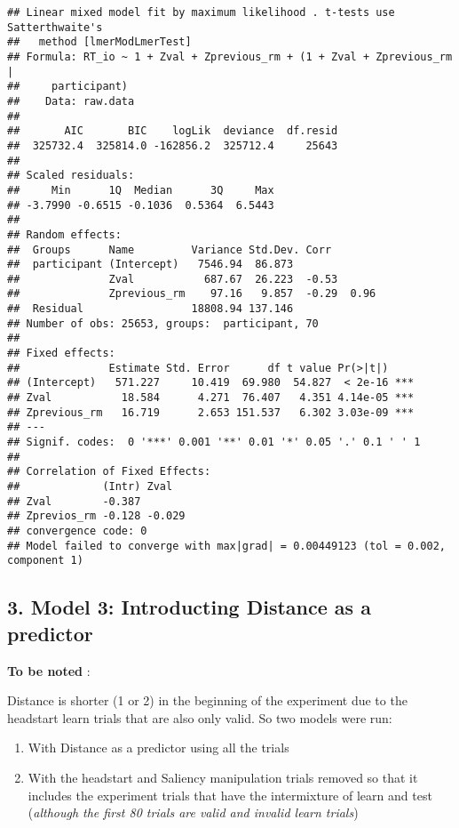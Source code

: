 \documentclass[
]{article}
\providecommand{\tightlist}{%
  \setlength{\itemsep}{0pt}\setlength{\parskip}{0pt}}
\begin{document}
\begin{verbatim}
## Linear mixed model fit by maximum likelihood . t-tests use Satterthwaite's
##   method [lmerModLmerTest]
## Formula: RT_io ~ 1 + Zval + Zprevious_rm + (1 + Zval + Zprevious_rm |  
##     participant)
##    Data: raw.data
## 
##       AIC       BIC    logLik  deviance  df.resid 
##  325732.4  325814.0 -162856.2  325712.4     25643 
## 
## Scaled residuals: 
##     Min      1Q  Median      3Q     Max 
## -3.7990 -0.6515 -0.1036  0.5364  6.5443 
## 
## Random effects:
##  Groups      Name         Variance Std.Dev. Corr       
##  participant (Intercept)   7546.94  86.873             
##              Zval           687.67  26.223  -0.53      
##              Zprevious_rm    97.16   9.857  -0.29  0.96
##  Residual                 18808.94 137.146             
## Number of obs: 25653, groups:  participant, 70
## 
## Fixed effects:
##              Estimate Std. Error      df t value Pr(>|t|)    
## (Intercept)   571.227     10.419  69.980  54.827  < 2e-16 ***
## Zval           18.584      4.271  76.407   4.351 4.14e-05 ***
## Zprevious_rm   16.719      2.653 151.537   6.302 3.03e-09 ***
## ---
## Signif. codes:  0 '***' 0.001 '**' 0.01 '*' 0.05 '.' 0.1 ' ' 1
## 
## Correlation of Fixed Effects:
##             (Intr) Zval  
## Zval        -0.387       
## Zprevios_rm -0.128 -0.029
## convergence code: 0
## Model failed to converge with max|grad| = 0.00449123 (tol = 0.002, component 1)
\end{verbatim}

\hypertarget{model-3-introducting-distance-as-a-predictor}{%
\subsection{3. Model 3: Introducting Distance as a
predictor}\label{model-3-introducting-distance-as-a-predictor}}

\textbf{To be noted} :

Distance is shorter (1 or 2) in the beginning of the experiment due to
the headstart learn trials that are also only valid. So two models were
run:

\begin{enumerate}
\def\labelenumi{\arabic{enumi}.}
\tightlist
\item
  With Distance as a predictor using all the trials
\item
  With the headstart and Saliency manipulation trials removed so that it
  includes the experiment trials that have the intermixture of learn and
  test (\emph{although the first 80 trials are valid and invalid learn
  trials})
\end{enumerate}
\end{document}
